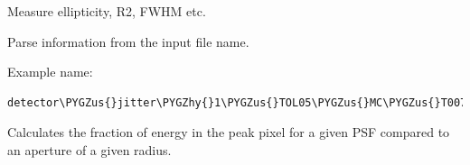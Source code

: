 \documentclass[a4paper,11pt,english]{sphinxmanual}
\def\PYGZus{\char`\_}
\def\PYGZhy{\char`\-}
\begin{document}

\begin{fulllineitems}
\label{analysis:analysis.PSFproperties.measureChars}
Measure ellipticity, R2, FWHM etc.

\end{fulllineitems}


\begin{fulllineitems}
\label{analysis:analysis.PSFproperties.parseName}
Parse information from the input file name.

Example name:

\begin{Verbatim}[commandchars=\\\{\}]
detector\PYGZus{}jitter\PYGZhy{}1\PYGZus{}TOL05\PYGZus{}MC\PYGZus{}T0074\PYGZus{}50arcmin2\PYGZus{}grid\PYGZus{}Nim=16384x16384\PYGZus{}pixsize=1.000um\PYGZus{}lbda=800nm\PYGZus{}fieldX=\PYGZhy{}0.306\PYGZus{}fieldY=1.042.fits
\end{Verbatim}

\end{fulllineitems}


\begin{fulllineitems}
\label{analysis:analysis.PSFproperties.peakFraction}
Calculates the fraction of energy in the peak pixel for a given PSF compared
to an aperture of a given radius.

\end{fulllineitems}


\begin{fulllineitems}
\label{analysis:analysis.PSFproperties.plotEncircledEnergy}
\end{fulllineitems}
\end{document}
